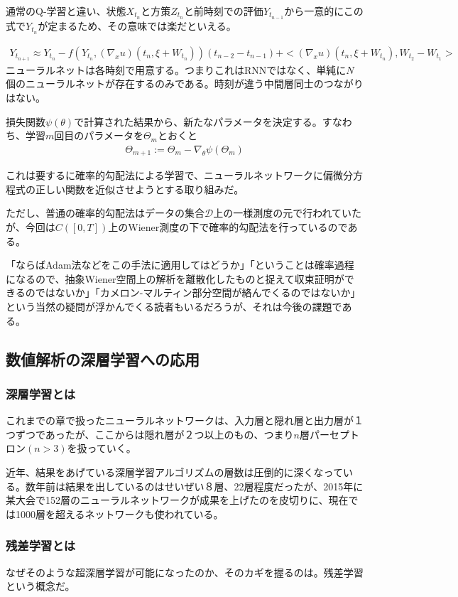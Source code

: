\documentclass[dvipdfmx, a4paper]{jsarticle}
\begin{document}
通常のQ-学習と違い、状態$X_{t_n}$と方策$Z_{t_n}$と前時刻での評価$Y_{t_{n-1}}$から一意的にこの式で$Y_{t_n}$が定まるため、その意味では楽だといえる。

\begin{align}
Y_{t_{n+1}}\approx Y_{t_n}-f(Y_{t_n},(\nabla_xu)(t_n,\xi+W_{t_n}))(t_{n-2}-t_{n-1})+<(\nabla_xu)(t_n,\xi+W_{t_n}),W_{t_2}-W_{t_1}>
\end{align}
ニューラルネットは各時刻で用意する。つまりこれはRNNではなく、単純に$N$個のニューラルネットが存在するのみである。時刻が違う中間層同士のつながりはない。

損失関数$\psi(\theta)$で計算された結果から、新たなパラメータを決定する。すなわち、学習$m$回目のパラメータを$\Theta_m$とおくと
\begin{align}
\Theta_{m+1}:=\Theta_{m}-\nabla_\theta\psi(\Theta_m)
\end{align}

これは要するに確率的勾配法による学習で、ニューラルネットワークに偏微分方程式の正しい関数を近似させようとする取り組みだ。

ただし、普通の確率的勾配法はデータの集合$\mathcal{D}$上の一様測度の元で行われていたが、今回は$C([0,T])$上のWiener測度の下で確率的勾配法を行っているのである。

「ならばAdam法などをこの手法に適用してはどうか」「ということは確率過程になるので、抽象Wiener空間上の解析を離散化したものと捉えて収束証明ができるのではないか」「カメロン-マルティン部分空間が絡んでくるのではないか」という当然の疑問が浮かんでくる読者もいるだろうが、それは今後の課題である。

\subsection{数値解析の深層学習への応用}

\subsubsection{深層学習とは}
これまでの章で扱ったニューラルネットワークは、入力層と隠れ層と出力層が１つずつであったが、ここからは隠れ層が２つ以上のもの、つまり$n$層パーセプトロン$(n>3)$を扱っていく。

近年、結果をあげている深層学習アルゴリズムの層数は圧倒的に深くなっている。数年前は結果を出しているのはせいぜい８層、22層程度だったが、2015年に某大会で152層のニューラルネットワークが成果を上げたのを皮切りに、現在では1000層を超えるネットワークも使われている。

\subsubsection{残差学習とは}
なぜそのような超深層学習が可能になったのか、そのカギを握るのは。残差学習という概念だ。
\end{document}
